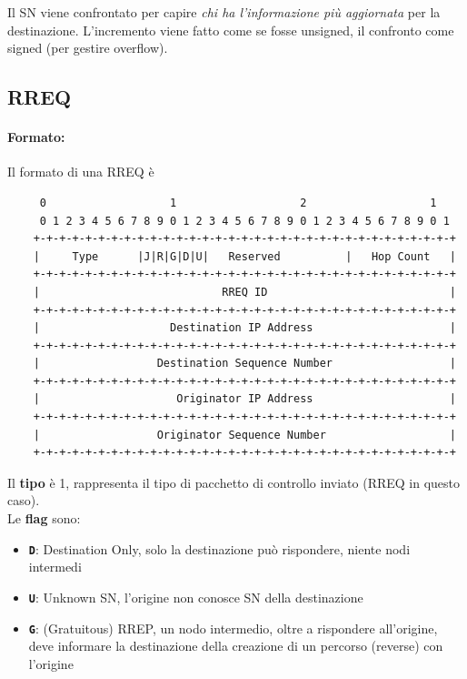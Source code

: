 Il SN viene confrontato per capire \textit{chi ha l'informazione più aggiornata} per la destinazione. L'incremento viene fatto come se fosse unsigned, il confronto come signed (per gestire overflow).\\

\newpage

\subsection{RREQ}

\paragraph{Formato:} Il formato di una RREQ è 
\begin{verbatim}
	 0                   1                   2                   1
	 0 1 2 3 4 5 6 7 8 9 0 1 2 3 4 5 6 7 8 9 0 1 2 3 4 5 6 7 8 9 0 1
	+-+-+-+-+-+-+-+-+-+-+-+-+-+-+-+-+-+-+-+-+-+-+-+-+-+-+-+-+-+-+-+-+
	|     Type      |J|R|G|D|U|   Reserved          |   Hop Count   |
	+-+-+-+-+-+-+-+-+-+-+-+-+-+-+-+-+-+-+-+-+-+-+-+-+-+-+-+-+-+-+-+-+
	|                            RREQ ID                            |
	+-+-+-+-+-+-+-+-+-+-+-+-+-+-+-+-+-+-+-+-+-+-+-+-+-+-+-+-+-+-+-+-+
	|                    Destination IP Address                     |
	+-+-+-+-+-+-+-+-+-+-+-+-+-+-+-+-+-+-+-+-+-+-+-+-+-+-+-+-+-+-+-+-+
	|                  Destination Sequence Number                  |
	+-+-+-+-+-+-+-+-+-+-+-+-+-+-+-+-+-+-+-+-+-+-+-+-+-+-+-+-+-+-+-+-+
	|                     Originator IP Address                     |
	+-+-+-+-+-+-+-+-+-+-+-+-+-+-+-+-+-+-+-+-+-+-+-+-+-+-+-+-+-+-+-+-+
	|                  Originator Sequence Number                   |
	+-+-+-+-+-+-+-+-+-+-+-+-+-+-+-+-+-+-+-+-+-+-+-+-+-+-+-+-+-+-+-+-+
\end{verbatim}

Il \textbf{tipo} è 1, rappresenta il tipo di pacchetto di controllo inviato (RREQ in questo caso).\\

Le \textbf{flag} sono: 
\begin{itemize}
	\item \textbf{\texttt{D}}: Destination Only, solo la destinazione può rispondere, niente nodi intermedi
	\item \textbf{\texttt{U}}: Unknown SN, l'origine non conosce SN della destinazione
	\item \textbf{\texttt{G}}: (Gratuitous) RREP, un nodo intermedio, oltre a rispondere all'origine, deve informare la destinazione della creazione di un percorso (reverse) con l'origine
\end{itemize}

